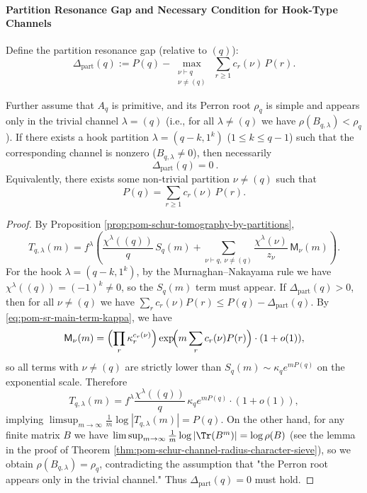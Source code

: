 \paragraph{Partition Resonance Gap and Necessary Condition for Hook-Type Channels}
Define the partition resonance gap (relative to \((q)\)):
\[
\Delta_{\mathrm{part}}(q)
:=
P(q)-\max_{\substack{\nu\vdash q\\ \nu\neq (q)}}\ \sum_{r\ge 1}c_r(\nu)\,P(r).
\]

\begin{theorem}[Hook-Type Channel \texorpdfstring{$\Rightarrow$}{=>} Resonance Gap Closure]\label{thm:pom-hook-channel-implies-partition-gap-closed}
Further assume that \(A_q\) is primitive, and its Perron root \(\rho_q\) is simple and appears only in the trivial channel \(\lambda=(q)\) (i.e., for all \(\lambda\neq(q)\) we have \(\rho(B_{q,\lambda})<\rho_q\)).
If there exists a hook partition \(\lambda=(q-k,1^k)\) (\(1\le k\le q-1\)) such that the corresponding channel is nonzero (\(B_{q,\lambda}\neq 0\)), then necessarily
\[
\boxed{\ \Delta_{\mathrm{part}}(q)=0\ }.
\]
Equivalently, there exists some non-trivial partition \(\nu\neq(q)\) such that
\[
P(q)=\sum_{r\ge 1}c_r(\nu)\,P(r).
\]
\end{theorem}
\begin{proof}
By Proposition \ref{prop:pom-schur-tomography-by-partitions},
\[
T_{q,\lambda}(m)
=
f^\lambda\left(\frac{\chi^\lambda((q))}{q}\,S_q(m)+\sum_{\nu\vdash q,\ \nu\neq(q)}\frac{\chi^\lambda(\nu)}{z_\nu}\,\mathsf{M}_\nu(m)\right).
\]
For the hook \(\lambda=(q-k,1^k)\), by the Murnaghan--Nakayama rule we have \(\chi^\lambda((q))=(-1)^k\neq 0\), so the \(S_q(m)\) term must appear.
If \(\Delta_{\mathrm{part}}(q)>0\), then for all \(\nu\neq(q)\) we have
\(
\sum_r c_r(\nu)P(r)\le P(q)-\Delta_{\mathrm{part}}(q)
\).
By \eqref{eq:pom-sr-main-term-kappa}, we have
\[
\mathsf{M}_\nu(m)
=
\Bigl(\prod_r \kappa_r^{c_r(\nu)}\Bigr)\exp\!\Bigl(m\sum_r c_r(\nu)P(r)\Bigr)\cdot(1+o(1)),
\]
so all terms with \(\nu\neq(q)\) are strictly lower than \(S_q(m)\sim \kappa_q e^{mP(q)}\) on the exponential scale.
Therefore
\[
T_{q,\lambda}(m)
=
f^\lambda\frac{\chi^\lambda((q))}{q}\,\kappa_q e^{mP(q)}\cdot(1+o(1)),
\]
implying
\(
\limsup_{m\to\infty}\frac{1}{m}\log|T_{q,\lambda}(m)|=P(q)
\).
On the other hand, for any finite matrix \(B\) we have
\(
\limsup_{m\to\infty}\frac{1}{m}\log|\Tr(B^m)|=\log\rho(B)
\)
(see the lemma in the proof of Theorem \ref{thm:pom-schur-channel-radius-character-sieve}), so we obtain \(\rho(B_{q,\lambda})=\rho_q\), contradicting the assumption that "the Perron root appears only in the trivial channel."
Thus \(\Delta_{\mathrm{part}}(q)=0\) must hold.
\end{proof}

